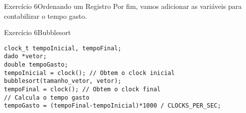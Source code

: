 \documentclass[aspectratio=169]{beamer}
\begin{document}

\begin{frame}[fragile]{Exercício 6}{Ordenando um Registro}
Por fim, vamos adicionar as variáveis para contabilizar o tempo gasto.
\end{frame}


\begin{frame}[fragile]{Exercício 6}{Bubblesort}
\begin{lstlisting}[style=CStyle]
clock_t tempoInicial, tempoFinal;
dado *vetor;
double tempoGasto;
tempoInicial = clock(); // Obtem o clock inicial
bubblesort(tamanho_vetor, vetor);
tempoFinal = clock(); // Obtem o clock final
// Calcula o tempo gasto
tempoGasto = (tempoFinal-tempoInicial)*1000 / CLOCKS_PER_SEC; 
\end{lstlisting}
\end{frame}


\begin{frame}[plain]
  \titlepage
\end{frame}
\end{document}
